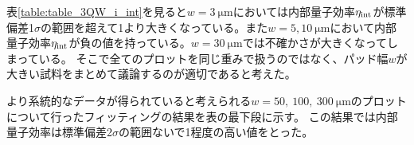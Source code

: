 {表\ref{table:table_3QW_i_int}を見ると$w=3\ \si{\micro\metre}$においては内部量子効率$\eta_{\rm{int}}$が標準偏差1$\sigma$の範囲を超えて1より大きくなっている。また$w=5, 10\ \si{\micro\metre}$において内部量子効率$\eta_{\rm{int}}$が負の値を持っている。$w=30\  \si{\micro\metre}$では不確かさが大きくなってしまっている。
そこで全てのプロットを同じ重みで扱うのではなく、パッド幅$w$が大きい試料をまとめて議論するのが適切であると考えた。

より系統的なデータが得られていると考えられる$w=50,\ 100,\ 300\ \si{\micro\metre}$のプロットについて行ったフィッティングの結果を表の最下段に示す。
この結果では内部量子効率は標準偏差2$\sigma$の範囲ないで1程度の高い値をとった。


}
